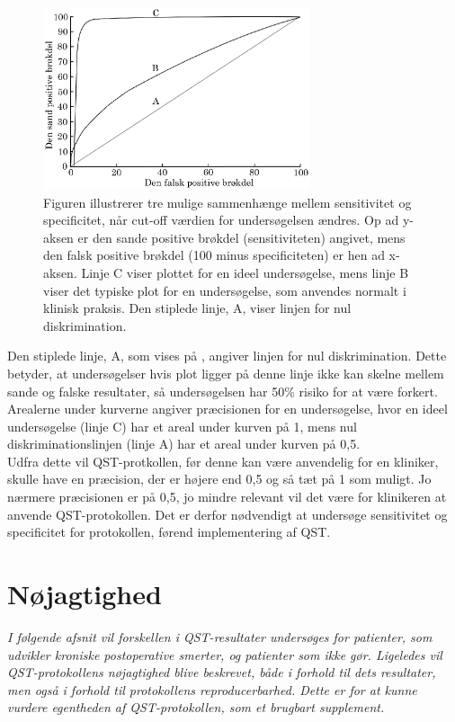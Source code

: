 \begin{figure}[H]
\centering
\includegraphics[width=0.7\textwidth]{figures/dHTAanalyse/AUC}
\caption{Figuren illustrerer tre mulige sammenhænge mellem sensitivitet og specificitet, når cut-off værdien for undersøgelsen ændres. Op ad y-aksen er den sande positive brøkdel (sensitiviteten) angivet, mens den falsk positive brøkdel (100 minus specificiteten) er hen ad x-aksen. Linje C viser plottet for en ideel undersøgelse, mens linje B viser det typiske plot for en undersøgelse, som anvendes normalt i klinisk praksis. Den stiplede linje, A, viser linjen for nul diskrimination. \citep{Lalkhen2008}}\label{fig:AUC}
\end{figure} \vspace{-.25cm}

Den stiplede linje, A, som vises på , angiver linjen for nul diskrimination. Dette betyder, at undersøgelser hvis plot ligger på denne linje ikke kan skelne mellem sande og falske resultater, så undersøgelsen har 50\% risiko for at være forkert. Arealerne under kurverne angiver præcisionen for en undersøgelse, hvor en ideel undersøgelse (linje C) har et areal under kurven på 1, mens nul diskriminationslinjen (linje A) har et areal under kurven på 0,5. \\
Udfra dette vil QST-protkollen, før denne kan være anvendelig for en kliniker, skulle have en præcision, der er højere end 0,5 og så tæt på 1 som muligt. Jo nærmere præcisionen er på 0,5, jo mindre relevant vil det være for klinikeren at anvende QST-protokollen. Det er derfor nødvendigt at undersøge sensitivitet og specificitet for protokollen, førend implementering af QST. 

\section{Nøjagtighed}
\textit{I følgende afsnit vil forskellen i QST-resultater undersøges for patienter, som udvikler kroniske postoperative smerter, og patienter som ikke gør. Ligeledes vil QST-protokollens nøjagtighed blive beskrevet, både i forhold til dets resultater, men også i forhold til protokollens reproducerbarhed. Dette er for at kunne vurdere egentheden af QST-protokollen, som et brugbart supplement.}


